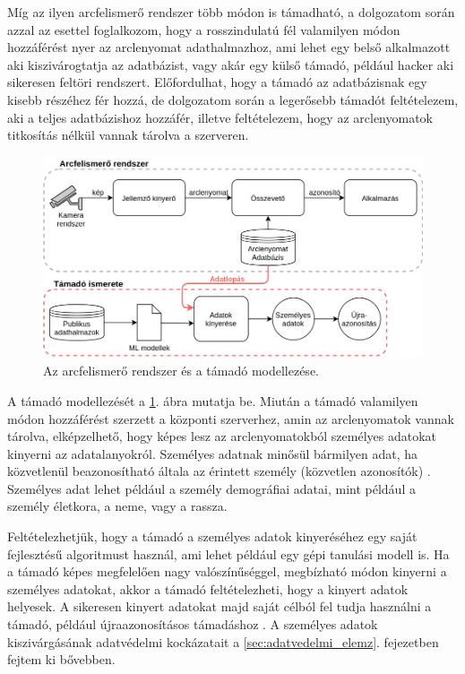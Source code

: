 Míg az ilyen arcfelismerő rendszer több módon is támadható, a dolgozatom során azzal az esettel foglalkozom, hogy a rosszindulatú fél valamilyen módon hozzáférést nyer az arclenyomat adathalmazhoz, ami lehet egy belső alkalmazott aki kiszivárogtatja az adatbázist, vagy akár egy külső támadó, például hacker aki sikeresen feltöri rendszert. Előfordulhat, hogy a támadó az adatbázisnak egy kisebb részéhez fér hozzá, de dolgozatom során a legerősebb támadót feltételezem, aki a teljes adatbázishoz hozzáfér, illetve feltételezem, hogy az arclenyomatok titkosítás nélkül vannak tárolva a szerveren.

\begin{figure}[ht]
	\centering
	\includegraphics[width=1\columnwidth]{figures/attacker_model.png}
	\caption{Az arcfelismerő rendszer és a támadó modellezése.}
	\label{fig:attacker}
\end{figure}

A támadó modellezését a \ref{fig:attacker}. ábra mutatja be. Miután a támadó valamilyen módon hozzáférést szerzett a központi szerverhez, amin az arclenyomatok vannak tárolva, elképzelhető, hogy képes lesz az arclenyomatokból személyes adatokat kinyerni az adatalanyokról. Személyes adatnak minősül bármilyen adat, ha közvetlenül beazonosítható általa az érintett személy (közvetlen azonosítók) \cite{GDPR2018}. Személyes adat lehet például a személy demográfiai adatai, mint például a személy életkora, a neme, vagy a rassza. 

Feltételezhetjük, hogy a támadó a személyes adatok kinyeréséhez egy saját fejlesztésű algoritmust használ, ami lehet például egy gépi tanulási modell is. Ha a támadó képes megfelelően nagy valószínűséggel, megbízható módon kinyerni a személyes adatokat, akkor a támadó feltételezheti, hogy a kinyert adatok helyesek. A sikeresen kinyert adatokat majd saját célból fel tudja használni a támadó, például újraazonosításos támadáshoz \cite{fabian2020anon}. A személyes adatok kiszivárgásának adatvédelmi kockázatait a \ref{sec:adatvedelmi_elemz}. fejezetben fejtem ki bővebben.


